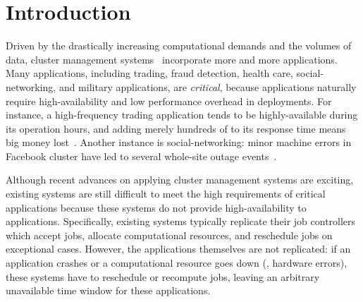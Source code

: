 \section{Introduction} \label{sec:intro}

Driven by the drastically increasing computational demands and the volumes of 
data, cluster 
management systems~\cite{borg:eurosys15,mesos:nsdi11,tupperware,yarn:socc13,
autopilot:sosp07,quincy:sosp09,apollo:osdi14,fuxi:vldb14} 
incorporate more and more applications. Many applications, including trading, 
fraud detection, health care, social-networking, and military applications, are 
\emph{critical}, because applications naturally require high-availability and 
low performance overhead in deployments. For instance, a high-frequency trading 
application tends to be highly-available during its operation hours, and adding 
merely hundreds of \us to its response time means big money 
lost~\cite{nosql:finance}. Another instance is social-networking: minor machine 
errors in Facebook cluster have led to several whole-site outage 
events~\cite{facebook:outage}.



Although recent advances on applying cluster management systems are exciting, 
existing systems are still difficult to meet the high requirements of 
critical applications because these systems do not provide high-availability to 
applications. Specifically, existing systems typically replicate their job 
controllers which accept jobs, allocate computational resources, and reschedule 
jobs on exceptional cases. However, the applications themselves are not 
replicated: if an application crashes or a computational resource goes down 
(\eg, hardware errors), these systems have to reschedule or recompute jobs, 
leaving an arbitrary unavailable time window for these applications.

